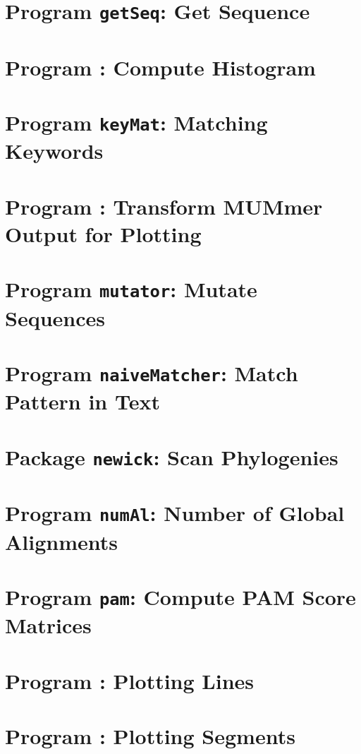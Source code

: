 \documentclass[a4paper]{report}
\begin{document}
\chapter{Program \texttt{getSeq}: Get Sequence}\label{ch:get}

\chapter{Program : Compute Histogram}\label{ch:his}

\chapter{Program \texttt{keyMat}: Matching Keywords}\label{ch:km}

\chapter{Program : Transform MUMmer Output for
  Plotting}\label{ch:m2p}

\chapter{Program \texttt{mutator}: Mutate Sequences}\label{ch:mut}

\chapter{Program \texttt{naiveMatcher}: Match Pattern in
  Text}\label{ch:nm}

\chapter{Package \texttt{newick}: Scan Phylogenies}\label{ch:new}

\chapter{Program \texttt{numAl}: Number of Global Alignments}\label{ch:num}

\chapter{Program \texttt{pam}: Compute PAM Score
  Matrices}\label{ch:pam}

\chapter{Program : Plotting Lines}\label{ch:pl}

\chapter{Program : Plotting Segments}\label{ch:ps}

\end{document}
